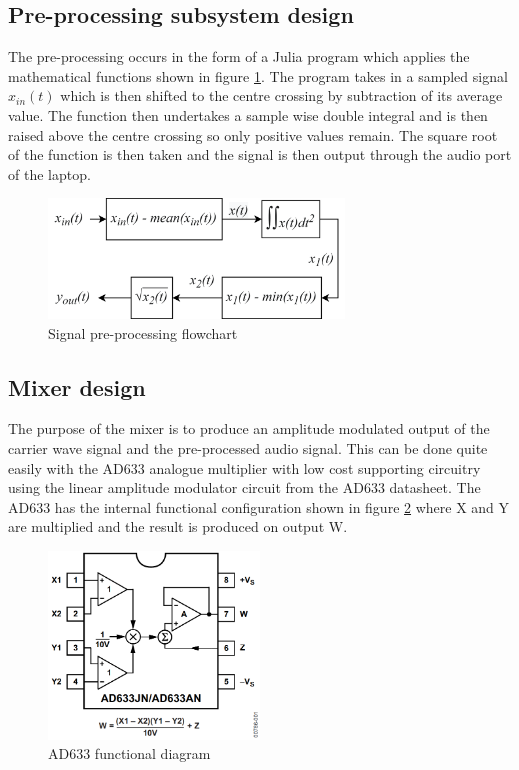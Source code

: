 \subsection{Pre-processing subsystem design}
The pre-processing occurs in the form of a Julia program which applies the mathematical functions shown in figure \ref{fig:sigpreprocessflow}. The program takes in a sampled signal $x_{in}(t)$ which is then shifted to the centre crossing by subtraction of its average value. The function then undertakes a sample wise double integral and is then raised above the centre crossing so only positive values remain. The square root of the function is then taken and the signal is then output through the audio port of the laptop.
\begin{figure}[ht!]
    \centering
    \includegraphics[width=0.7\textwidth]{Figures/Design/Preprocessing Design.png}
    \caption{Signal pre-processing flowchart}
    \label{fig:sigpreprocessflow}
\end{figure}


\subsection{Mixer design}
The purpose of the mixer is to produce an amplitude modulated output of the carrier wave signal and the pre-processed audio signal. This can be done quite easily with the AD633 analogue multiplier with low cost supporting circuitry using the linear amplitude modulator circuit from the AD633 datasheet. The AD633 has the internal functional configuration shown in figure \ref{fig:mixerfunc} where X and Y are multiplied and the result is produced on output W.

\begin{figure}[ht!]
    \centering
    \includegraphics[width=0.5\textwidth]{Figures/Design/Mixer/ad633Intr.png}
    \caption{AD633 functional diagram}
    \label{fig:mixerfunc}
\end{figure}

